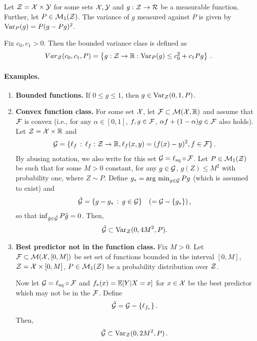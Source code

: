 \documentclass[twoside]{article}
\newcommand{\set}[1]{\left\{#1\right\}}
\begin{document}
Let $\mathcal{Z} = \mathcal{X} \times \mathcal{Y}$ for some sets $\mathcal{X}, \mathcal{Y}$ and $g:\mathcal{Z} \to \mathcal{R}$ be a measurable function. Further, let $P \in \mathcal{M}_1(\mathcal{Z})$. The variance of $g$ measured against $P$ is given by $\operatorname{Var}_P(g) = P(g-Pg)^2$.

\begin{definition}
    Fix $c_0, c_1 > 0$. Then the bounded variance class is defined as
    \[
        Var_{\cZ}(c_0, c_1, P) = \set{g: \cZ \to \R : \Var_P(g) \le c_0^2 + c_1Pg } \,.
    \]
\end{definition}

\paragraph{Examples.}
\begin{enumerate}
    \item \textbf{Bounded functions.} If $0 \le g \le 1$, then $g \in \operatorname{Var}_{\mathcal{Z}}(0, 1, P)$.

    \item \textbf{Convex function class. }
    For some set $\mathcal{X}$, let $\mathcal{F} \subset \mathcal{M}(\mathcal{X},\mathbb{R})$ and assume that $\mathcal{F}$ is convex (i.e., for any $\alpha\in [0,1]$, $f,g\in \mathcal{F}$, $\alpha f + (1-\alpha)g \in \mathcal{F}$ also holds).
    Let $\mathcal{Z} = \mathcal{X} \times \mathbb{R}$ and 
    \[
        \mathcal{G} = \{ \ell_f \,:\, \ell_f: \mathcal{Z} \to \mathbb{R}, \ell_f(x,y) = (f(x)-y)^2, f\in \mathcal{F} \}\,.
    \]
    By abusing notation, we also write for this set  $\mathcal{G} = \ell_{\text{sq}}\circ \mathcal{F}$.
    Let $P\in \mathcal{M}_1(\mathcal{Z})$ be such that
    for some $M>0$ constant, for any $g\in \mathcal{G}$, $g(Z)\le M^2$ with probability one, where $Z\sim P$.
    Define $g_* = \operatorname*{arg\ min}_{g\in \mathcal{G}} P g$ (which is assumed to exist) and 
    \begin{align*}
    \tilde{\mathcal{G}} = \{ g - g_* \,:\, g\in \mathcal{G} \}  \quad (= \mathcal{G} - \{ g_*\})\,,
    \end{align*}
    so that $\inf_{\tilde{g} \in \tilde{\mathcal{G}}} P\tilde{g} = 0$. Then, 
    \begin{align*}
    \tilde {\mathcal{G}} \subset \operatorname{Var}_{\mathcal{Z}}(0, 4M^2,P).
    \end{align*}

    \item \textbf{Best predictor not in the function class. }
    Fix $M>0$. Let $\mathcal{F} \subset \mathcal{M}(\mathcal{X},[0,M])$ be set set of functions bounded in the interval $[0,M]$, $\mathcal{Z} = \mathcal{X} \times [0,M]$, $P\in \mathcal{M}_1(\mathcal{Z})$ be a probability distribution over $\mathcal{Z}$.
    
    Now let $\mathcal{G} = \ell_{\text{sq}} \circ \mathcal{F}$ and $f_*(x) = \mathbb{E}[Y|X=x]$ for $x\in \mathcal{X}$ be the best predictor which may not be in the $\mathcal{F}$. Define
    \[
        \tilde {\mathcal{G}} = \mathcal{G} - \{ \ell_{f_*} \}\,.
    \]
    Then,
    \[
        \tilde {\mathcal{G}} \subset \operatorname{Var}_{\mathcal{Z}}(0, 2M^2,P) \,.
    \]  
\end{enumerate}

 
\end{document}
